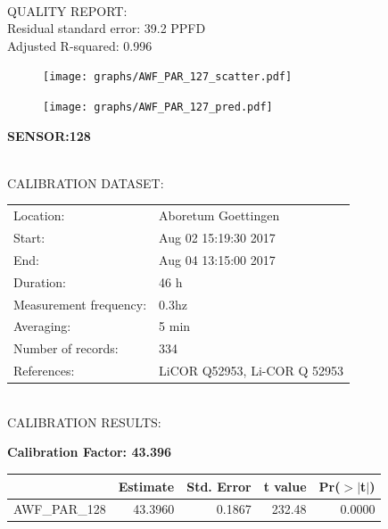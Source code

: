 \documentclass[oneside]{report}
\begin{document}
\hrulefill\\
QUALITY REPORT:\\
Residual standard error: 39.2 PPFD\\
Adjusted R-squared: 0.996



\begin{figure}[H]
  \centering
  \texttt{[image: graphs/AWF\_PAR\_127\_scatter.pdf]}
\end{figure}




\begin{figure}[H]
  \centering
  \texttt{[image: graphs/AWF\_PAR\_127\_pred.pdf]}
\end{figure}

\pagebreak


\begin{center}
\large{\textbf{SENSOR:128}}\\
\end{center}

\hrulefill\\
CALIBRATION DATASET:\\
\begin{table}[h!]
  \centering
  \label{tab:table1}
  \begin{tabular}{ll}
    Location: & Aboretum Goettingen\\ 
    
    
    Start:  & Aug 02 15:19:30 2017 \\
    End:   & Aug 04 13:15:00 2017\\ 
    Duration: & 46 h\\
    Measurement frequency: & 0.3hz\\
    Averaging:  &5 min\\
    Number of records: & 334 \\
    References: & LiCOR Q52953, Li-COR Q 52953 \\
  \end{tabular}
\end{table}

\hrulefill\\
CALIBRATION RESULTS:\\


\begin{center}
\textbf{\large{Calibration Factor: 43.396}}\\
\end{center}
\begin{table}[ht]
\centering
\begin{tabular}{rrrrr}
  \hline
 & Estimate & Std. Error & t value & Pr($>$$|$t$|$) \\ 
  \hline
AWF\_PAR\_128 & 43.3960 & 0.1867 & 232.48 & 0.0000 \\ 
   \hline
\end{tabular}
\end{table}
\end{document}
